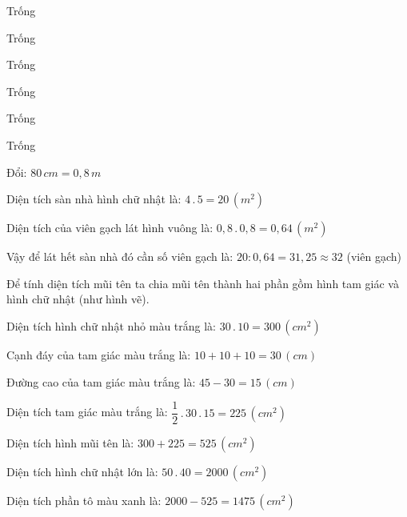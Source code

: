 \begin{Answer}{1}
		Trống
	
\end{Answer}
\begin{Answer}{2}
		Trống
	
\end{Answer}
\begin{Answer}{3}
		Trống
	
\end{Answer}
\begin{Answer}{4}
		Trống
	
\end{Answer}
\begin{Answer}{5}
		Trống
	
\end{Answer}
\begin{Answer}{6}
		Trống
	
\end{Answer}
\begin{Answer}{7}
		Đổi: $80\,cm=0,8\,m$
		
		Diện tích sàn nhà hình chữ nhật là:
		$4\,.\,5=20\,(m^2)$
		
		Diện tích của viên gạch lát hình vuông là:
		$0,8\,.\,0,8=0,64\,(m^2)$
		
		Vậy để lát hết sàn nhà đó cần số viên gạch là:
		$20:0,64=31,25\approx 32$ (viên gạch)
	
\end{Answer}
\begin{Answer}{8}
		Để tính diện tích mũi tên ta chia mũi tên thành hai phần gồm hình tam giác và hình chữ nhật (như hình vẽ).
		
		Diện tích hình chữ nhật nhỏ màu trắng là: $30\,.\,10=300\,(cm^2)$
		
		Cạnh đáy của tam giác màu trắng là: $10+10+10=30\,(cm)$
		
		Đường cao của tam giác màu trắng là: $45-30=15\,(cm)$
		
		Diện tích tam giác màu trắng là: $\dfrac{1}{2}\,.\,30\,.\,15=225\,(cm^2)$
		
		Diện tích hình mũi tên là: $300+225=525\,(cm^2)$
		
		Diện tích hình chữ nhật lớn là: $50\,.\,40=2000\,(cm^2)$
		
		Diện tích phần tô màu xanh là: $2000-525=1475\,(cm^2)$
	
\end{Answer}
